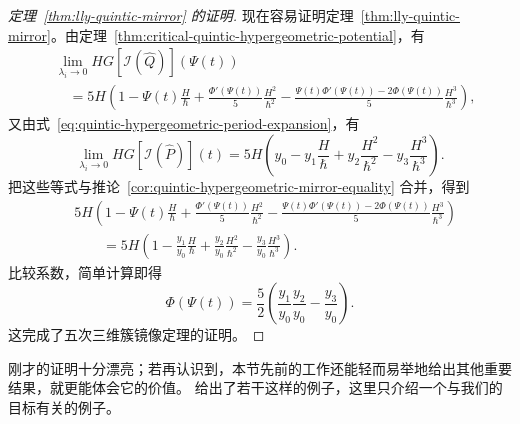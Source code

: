 \begin{proof}[定理~\ref{thm:lly-quintic-mirror} 的证明]
现在容易证明定理~\ref{thm:lly-quintic-mirror}。由定理~\ref{thm:critical-quintic-hypergeometric-potential}，有
\[
\begin{aligned}
&\lim_{\lambda_i\to0}HG[\mathcal I(\widehat Q)](\Psi(t))\\
&\quad=5H\left(1-\Psi(t)\frac H\hbar+\frac{\Phi'(\Psi(t))}{5}\frac{H^2}{\hbar^2}
-\frac{\Psi(t)\Phi'(\Psi(t))-2\Phi(\Psi(t))}{5}\frac{H^3}{\hbar^3}\right),
\end{aligned}
\]
又由式~\eqref{eq:quintic-hypergeometric-period-expansion}，有
\[
\lim_{\lambda_i\to0}HG[\mathcal I(\widehat P)](t)
=5H\left(y_0-y_1\frac H\hbar+y_2\frac{H^2}{\hbar^2}-y_3\frac{H^3}{\hbar^3}\right).
\]
把这些等式与推论~\ref{cor:quintic-hypergeometric-mirror-equality} 合并，得到
\[
\begin{aligned}
&5H\left(1-\Psi(t)\frac H\hbar+\frac{\Phi'(\Psi(t))}{5}\frac{H^2}{\hbar^2}
-\frac{\Psi(t)\Phi'(\Psi(t))-2\Phi(\Psi(t))}{5}\frac{H^3}{\hbar^3}\right)\\
&\qquad=5H\left(1-\frac{y_1}{y_0}\frac H\hbar
+\frac{y_2}{y_0}\frac{H^2}{\hbar^2}-\frac{y_3}{y_0}\frac{H^3}{\hbar^3}\right).
\end{aligned}
\]
比较系数，简单计算即得
\[
\Phi(\Psi(t))=\frac52\left(\frac{y_1}{y_0}\frac{y_2}{y_0}-\frac{y_3}{y_0}\right).
\]
这完成了五次三维簇镜像定理的证明。
\end{proof}
刚才的证明十分漂亮；若再认识到，本节先前的工作还能轻而易举地给出其他重要结果，就更能体会它的价值。 给出了若干这样的例子，这里只介绍一个与我们的目标有关的例子。
